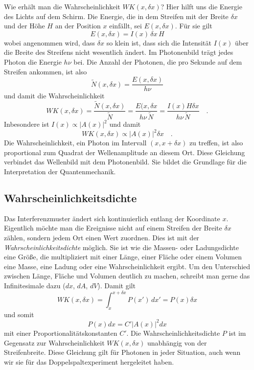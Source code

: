 Wie erhält man die Wahrscheinlichkeit $WK(x, \delta x)$? Hier hilft uns die Energie des Lichts auf dem Schirm. Die Energie, die in dem Streifen mit der Breite $\delta x$ und der Höhe $H$ an der Position $x$ einfällt, sei $E(x, \delta x)$. Für sie gilt 
\begin{equation}
    E(x, \delta x) = I(x) \, \delta x \, H
\end{equation}
wobei angenommen wird, dass $\delta x$ so klein ist, dass sich die Intensität $I(x)$ über die Breite des Streifens nicht wesentlich ändert. Im Photonenbild trägt jedes Photon die Energie $h \nu$ bei. Die Anzahl der Photonen, die pro Sekunde auf dem Streifen ankommen, ist also 
\begin{equation}
    \tilde{N}(x, \delta x) =\frac{ E(x, \delta x)}{h \nu}
\end{equation}
und damit die Wahrscheinlichkeit
\begin{equation}
    WK(x, \delta x) =  \frac{\tilde{N}(x, \delta x) }{\tilde{N}} =
    \frac{ E(x, \delta x}{h \nu \, \tilde{N}} = 
    \frac{ I(x) H \delta x}{h \nu \, \tilde{N}}     \quad .
\end{equation}
Inbesondere ist  $I(x) \propto |A(x)|^2$ und damit
\begin{equation}
    WK(x, \delta x)  \propto |A(x)|^2 \delta x \quad .
\end{equation}
Die Wahrscheinlichkeit, ein Photon im Intervall $(x, x+\delta x)$ zu treffen, ist also proportional zum Quadrat der Wellenamplitude an diesem Ort. Diese Gleichung verbindet das Wellenbild mit dem Photonenbild. Sie bildet die Grundlage für die Interpretation der Quantenmechanik.



\subsection{Wahrscheinlichkeitsdichte}

Das Interferenzmuster ändert sich kontinuierlich entlang der Koordinate $x$. Eigentlich möchte man die Ereignisse nicht auf einem Streifen der Breite $\delta x$ zählen, sondern jedem Ort einen Wert zuordnen. Dies ist mit der \emph{Wahrscheinlichkeitsdichte} möglich. Sie ist wie die Massen- oder Ladungsdichte eine Größe, die multipliziert mit einer Länge, einer Fläche oder einem Volumen eine Masse, eine Ladung oder eine Wahrscheinlichkeit ergibt. Um den Unterschied zwischen Länge, Fläche und Volumen deutlich zu machen, schreibt man gerne das Infinitesimale dazu ($dx$, $dA$, $dV$). Damit gilt 
\begin{equation}
    WK(x, \delta x)  = \int_{x}^{x + \delta x} P(x') \, dx' = P(x) \delta x 
\end{equation}
und somit
\begin{equation}
    P(x) dx  = C'  |A(x)|^2 dx
\end{equation}
mit einer Proportionalitätskonstanten $C'$.
Die Wahrscheinlichkeitsdichte $P$ ist im Gegensatz zur Wahrscheinlichkeit $WK(x, \delta x) $ unabhängig von der Streifenbreite. Diese Gleichung gilt für Photonen in jeder Situation, auch wenn wir sie für das Doppelspaltexperiment hergeleitet haben.



